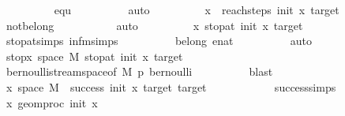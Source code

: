 \begin{isabellebody}
\ \ \ \ \ \ \ \ \isamarkupfalse%
\ equ{}\isanewline
\ \ \ \ \ \ \ \ \isamarkupfalse%
\ auto\isanewline
\ \ \ \ \ \ \isamarkupfalse%
\ \isamarkupfalse%
\ {\isachardoublequoteopen}{\isasymforall}x{\isachardot}{\kern0pt}\ {\isasymSqinter}\ reach{\isacharunderscore}{\kern0pt}steps\ init\ x\ target\ {\isacharequal}{\kern0pt}\ {}{\isachardoublequoteclose}\isanewline
\ \ \ \ \ \ \ \ \isamarkupfalse%
\ not{\isacharunderscore}{\kern0pt}belong\ \isanewline
\ \ \ \ \ \ \ \ \isamarkupfalse%
\ auto\isanewline
\ \ \ \ \ \ \isamarkupfalse%
\ \isamarkupfalse%
\ {\isachardoublequoteopen}{\isasymforall}x{\isachardot}{\kern0pt}\ stop{\isacharunderscore}{\kern0pt}at\ init\ x\ target\ {\isacharequal}{\kern0pt}\ {}{\isachardoublequoteclose}\isanewline
\ \ \ \ \ \ \ \ \isamarkupfalse%
\ stop{\isacharunderscore}{\kern0pt}at{\isachardot}{\kern0pt}simps\ infm{\isachardot}{\kern0pt}simps\isanewline
\ \ \ \ \ \ \ \ \isamarkupfalse%
\ belong{\isacharunderscore}{\kern0pt}{}\ enat{\isacharunderscore}{\kern0pt}{}\isanewline
\ \ \ \ \ \ \ \ \isamarkupfalse%
\ auto\isanewline
\ \ \ \ \ \ \isamarkupfalse%
\ \isamarkupfalse%
\ stop{\isacharcolon}{\kern0pt}{\isachardoublequoteopen}{\isasymforall}x{\isasymin}\ space\ M{\isachardot}{\kern0pt}\ stop{\isacharunderscore}{\kern0pt}at\ init\ x\ target\ {\isacharequal}{\kern0pt}\ {}{\isachardoublequoteclose}\isanewline
\ \ \ \ \ \ \ \ \isamarkupfalse%
\ bernoulli{\isacharunderscore}{\kern0pt}stream{\isacharunderscore}{\kern0pt}space{\isacharbrackleft}{\kern0pt}of\ M\ p{\isacharbrackright}{\kern0pt}\ bernoulli\isanewline
\ \ \ \ \ \ \ \ \isamarkupfalse%
\ blast\isanewline
\ \ \ \ \ \ \isamarkupfalse%
\ \isamarkupfalse%
\ {\isachardoublequoteopen}{\isasymforall}x{\isasymin}\ space\ M{\isachardot}{\kern0pt}\ {\isasymnot}\ success\ init\ x\ target{\isachardoublequoteclose}\ {\isachardoublequoteopen}target\ {\isasymnoteq}\ {}{\isachardoublequoteclose}\isanewline
\ \ \ \ \ \ \ \ \isamarkupfalse%
\ success{\isachardot}{\kern0pt}simps\isanewline
\ \ \ \ \ \ \ \ \isamarkupfalse%
\ {\isacartoucheopen}{\isasymAnd}x{\isachardot}{\kern0pt}\ geom{\isacharunderscore}{\kern0pt}proc\ init\ x\ {}\ {\isacharequal}{\kern0pt}\ {}{\isacartoucheclose}\isanewline

\end{isabellebody}
